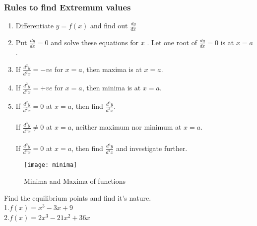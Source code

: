 \subsubsection{Rules to find Extremum values}
\begin{enumerate}
	\item Differentiate $y=f(x)$ and find out
$\frac{dy}{dx}$
	\item Put $\frac{d y}{d x}=0$ and solve these equations for $x$  . Let one root of $\frac{d y}{d x}=0$ is at $x=a$.
	\item If $\frac{d^{2} y}{d^{2} x}=-v e$ for $x=a$, then maxima is at $x=a$.
	\item If $\frac{d^{2} y}{d^{2} x}=+v e$ for $x=a$, then minima is at $x=a$.
	\item If $\frac{d^{2} y}{d^{2} x}=0$ at $x=a$, then find $\frac{d^{3} y}{d^{3} x}$.
	\\\\If $\frac{d^{3} y}{d^{3} x} \neq 0$ at $x=a$, neither maximum nor minimum at $x=a$.
	\\\\If $\frac{d^{3} y}{d^{3} x}=0$ at $x=a$, then find $\frac{d^{4} y}{d^{4} x}$ and investigate further.
	
\end{enumerate}
\begin{figure}[H]
	\begin{center}
		\texttt{[image: minima]}
	\end{center}
\caption{Minima and Maxima of functions}
\end{figure}
\begin{exercise}
	Find the equilibrium points and  find it's nature.
	\\1.$ f(x)=x^{3}-3x+9$
	\\2.$f(x)=2 x^{3}-21 x^{2}+36 x $
\end{exercise}
